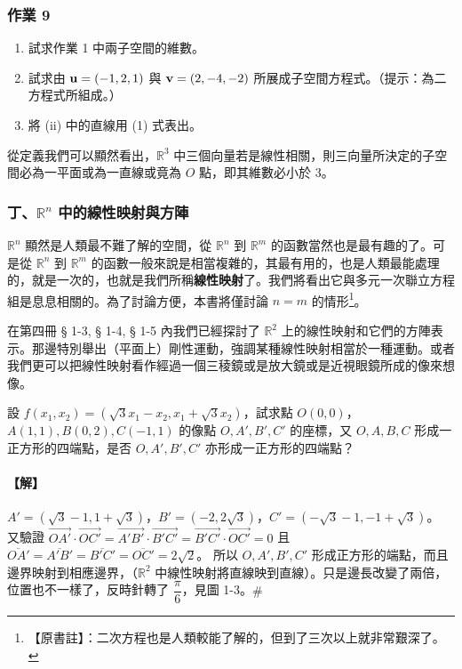 \subsubsection*{作業 9}\label{hw:b6s-1-9}
\begin{enumerate}[label=(\roman*), leftmargin=2em]
  \item 試求作業 1 中兩子空間的維數。
  \item 試求由 $\boldsymbol{\mathbf{u}}=(-1, 2, 1)$ 與 $\boldsymbol{\mathbf{v}}=(2, -4, -2)$ 所展成子空間方程式。（提示：為二方程式所組成。）
  \item 將 (ii) 中的直線用 (1) 式表出。
\end{enumerate}

從定義我們可以顯然看出，$\mathbb{R}^3$ 中三個向量若是線性相關，則三向量所決定的子空間必為一平面或為一直線或竟為 $O$ 點，即其維數必小於 3。

\subsubsection*{丁、$\mathbb{R}^n$ 中的線性映射與方陣}\label{subsec:b6s-1-1-d}

$\mathbb{R}^n$ 顯然是人類最不難了解的空間，從 $\mathbb{R}^n$ 到 $\mathbb{R}^m$ 的函數當然也是最有趣的了。可是從 $\mathbb{R}^n$ 到 $\mathbb{R}^m$ 的函數一般來說是相當複雜的，其最有用的，也是人類最能處理的，就是一次的，也就是我們所稱\textbf{線性映射}了。我們將看出它與多元一次聯立方程組是息息相關的。為了討論方便，本書將僅討論 $n=m$ 的情形\footnote{【原書註】：二次方程也是人類較能了解的，但到了三次以上就非常艱深了。}。

在第四冊 § 1-3, § 1-4, § 1-5 內我們已經探討了 $\mathbb{R}^2$ 上的線性映射和它們的方陣表示。那邊特別舉出（平面上）剛性運動，強調某種線性映射相當於一種運動。或者我們更可以把線性映射看作經過一個三稜鏡或是放大鏡或是近視眼鏡所成的像來想像。

\begin{example}\label{ex:b6s-1-7}
設 $f(x_1, x_2) = (\sqrt{3}x_1 - x_2, x_1 + \sqrt{3}x_2)$，試求點 $O(0, 0)$，$A(1, 1), B(0, 2), C(-1, 1)$ 的像點 $O, A', B', C'$ 的座標，又 $O, A, B, C$ 形成一正方形的四端點，是否 $O, A', B', C'$ 亦形成一正方形的四端點？
\end{example}

\paragraph{【解】}
$A'=(\sqrt{3}-1, 1+\sqrt{3})$，$B'=(-2, 2\sqrt{3})$，$C'=(-\sqrt{3}-1, -1+\sqrt{3})$。
又驗證 $\vec{OA'} \cdot \vec{OC'} = \vec{A'B'} \cdot \vec{B'C'} = \vec{B'C'} \cdot \vec{OC'} = 0$
且 $\overline{OA'} = \overline{A'B'} = \overline{B'C'} = \overline{OC'} = 2\sqrt{2}$。
所以 $O, A', B', C'$ 形成正方形的端點，而且邊界映射到相應邊界，（$\mathbb{R}^2$ 中線性映射將直線映到直線）。只是邊長改變了兩倍，位置也不一樣了，反時針轉了 $\dfrac{\pi}{6}$，見圖 1-3。\hfill$\#$

